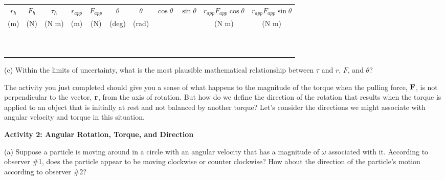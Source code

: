 \vspace{0.3cm}
{\centering \begin{tabular}{|c|c|c|c|c|c|c|c|c|c|c|}
\hline 
\( r_{h} \)&
\( F_{h} \)&
\( \tau _{h} \)&
\( r_{app} \)&
\( F_{app} \)&
\( \theta  \)&
\( \theta  \)&
\( \cos \theta  \)&
\( \sin \theta  \)&
\( r_{app} F_{app}\cos \theta  \) &
\(r_{app} F_{app}\sin \theta  \)\\
(m)&
(N)&
(N m)&
(m)&
(N)&
(deg)&
(rad)&
&
&
(N m)&
(N m)\\
\hline 
\hline 
&
&
&
&
&
&
&
&
&
&
\\
&
&
&
&
&
&
&
&
&
&
\\
\hline 
&
&
&
&
&
&
&
&
&
&
\\
&
&
&
&
&
&
&
&
&
&
\\
\hline 
&
&
&
&
&
&
&
&
&
&
\\
&
&
&
&
&
&
&
&
&
&
\\
\hline 
&
&
&
&
&
&
&
&
&
&
\\
&
&
&
&
&
&
&
&
&
&
\\
\hline 
&
&
&
&
&
&
&
&
&
&
\\
&
&
&
&
&
&
&
&
&
&
\\
\hline 
\end{tabular}\par}
\vspace{0.3cm}

(c) Within the limits of uncertainty, what is the most plausible mathematical
relationship between \( \tau  \) and $r$, $F$, and \( \theta  \)?
\vspace{20mm}

The activity you just completed should give you a sense of what happens to the
magnitude of the torque when the pulling force, \( {\bf F} \), is
not perpendicular to the vector, \( {\bf r} \), from the axis of
rotation. But how do we define the direction of the rotation that results when
the torque is applied to an object that is initially at rest and not balanced
by another torque? Let's consider the directions we might associate with angular
velocity and torque in this situation.

\textbf{Activity 2: Angular Rotation, Torque, and Direction }

(a) Suppose a particle is moving around in a circle with an angular velocity
that has a magnitude of \( \omega  \) associated with it. According to observer
\#1, does the particle appear to be moving clockwise or counter clockwise? How
about the direction of the particle's motion according to observer \#2?


